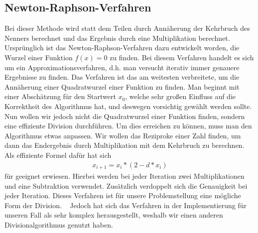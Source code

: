 \documentclass[course=erap]{aspdoc}
\begin{document}
    \subsection{Newton-Raphson-Verfahren}
    Bei dieser Methode wird statt dem Teilen durch Annäherung der Kehrbruch des Nenners berechnet und das Ergebnis durch eine Multiplikation berechnet.
    Ursprünglich ist das Newton-Raphson-Verfahren dazu entwickelt worden, die Wurzel einer Funktion \begin{math}
                                                                                                        f(x) = 0
    \end{math} zu finden. Bei diesem Verfahren handelt es sich um ein Approximationsverfahren, d.h. man versucht iterativ immer genauere Ergebnisse zu finden. Das Verfahren ist das am weitesten verbreitete, um die Annäherung einer Quadratwurzel einer Funktion zu finden. Man beginnt mit einer Abschätzung für den Startwert \begin{math}
                                                                                                                                                                                                                                                                                                                                       x_0
    \end{math}, welche sehr großen Einfluss auf die Korrektheit des Algorithmus hat, und deswegen vorsichtig gewählt werden sollte.~\cite{newtonmethod}
    Nun wollen wir jedoch nicht die Quadratwurzel einer Funktion finden, sondern eine effiziente Division durchführen. Um dies erreichen zu können, muss man den Algorithmus etwas anpassen. Wir wollen das Reziproke einer Zahl finden, um dann das Endergebnis durch Multiplikation mit dem Kehrbruch
    zu berechnen. Als effiziente Formel dafür hat sich
    \begin{align}
        x_{i+1} = x_i * (2- d*x_i)
    \end{align}
    für geeignet erwiesen. Hierbei werden bei jeder Iteration zwei Multiplikationen und eine Subtraktion verwendet. Zusätzlich verdoppelt sich die Genauigkeit bei jeder Iteration. Dieses Verfahren ist für unsere Problemstellung eine mögliche Form der Division. ~\cite{newtonapprox} Jedoch hat sich das Verfahren in der Implementierung für unseren Fall als sehr komplex herausgestellt, weshalb wir einen anderen Divisionalgorithmus genutzt haben.
\end{document}

